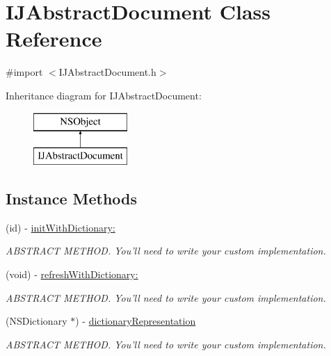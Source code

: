 \hypertarget{interface_i_j_abstract_document}{\section{I\+J\+Abstract\+Document Class Reference}
\label{interface_i_j_abstract_document}
}


{\ttfamily \#import $<$I\+J\+Abstract\+Document.\+h$>$}

Inheritance diagram for I\+J\+Abstract\+Document\+:\begin{figure}[H]
\begin{center}
\leavevmode
\includegraphics[height=2.000000cm]{interface_i_j_abstract_document}
\end{center}
\end{figure}
\subsection*{Instance Methods}
\begin{DoxyCompactItemize}
\item 
(id) -\/ \hyperlink{interface_i_j_abstract_document_a54f32ec1d0b54e699038c442c9a3e165}{init\+With\+Dictionary\+:}
\begin{DoxyCompactList}\small\item\em A\+B\+S\+T\+R\+A\+C\+T M\+E\+T\+H\+O\+D. You'll need to write your custom implementation. \end{DoxyCompactList}\item 
(void) -\/ \hyperlink{interface_i_j_abstract_document_a2be2916d90a20828bc0b1ca3947d7ca9}{refresh\+With\+Dictionary\+:}
\begin{DoxyCompactList}\small\item\em A\+B\+S\+T\+R\+A\+C\+T M\+E\+T\+H\+O\+D. You'll need to write your custom implementation. \end{DoxyCompactList}\item 
(N\+S\+Dictionary $\ast$) -\/ \hyperlink{interface_i_j_abstract_document_a0e928e60fba0d581ca2071771fa57ce6}{dictionary\+Representation}
\begin{DoxyCompactList}\small\item\em A\+B\+S\+T\+R\+A\+C\+T M\+E\+T\+H\+O\+D. You'll need to write your custom implementation. \end{DoxyCompactList}\end{DoxyCompactItemize}
